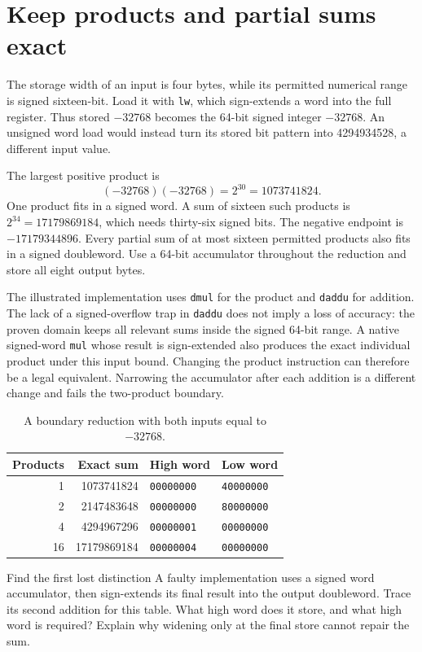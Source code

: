 \section{Keep products and partial sums exact}
The storage width of an input is four bytes, while its permitted numerical range
is signed sixteen-bit. Load it with \texttt{lw}, which sign-extends a word into
the full register. Thus stored \(-32768\) becomes the 64-bit signed integer
\(-32768\). An unsigned word load would instead turn its stored bit pattern into
4294934528, a different input value.

The largest positive product is
\[
 (-32768)(-32768)=2^{30}=1073741824.
\]
One product fits in a signed word. A sum of sixteen such products is
\(2^{34}=17179869184\), which needs thirty-six signed bits. The negative endpoint
is \(-17179344896\). Every partial sum of at most sixteen permitted products
also fits in a signed doubleword. Use a 64-bit accumulator throughout the reduction
and store all eight output bytes.

The illustrated implementation uses \texttt{dmul} for the product and
\texttt{daddu} for addition. The lack of a signed-overflow trap in \texttt{daddu}
does not imply a loss of accuracy: the proven domain keeps all relevant sums inside
the signed 64-bit range. A native signed-word \texttt{mul} whose result is sign-extended
also produces the exact individual product under this input bound. Changing the
product instruction can therefore be a legal equivalent. Narrowing the accumulator
after each addition is a different change and fails the two-product boundary.

\begin{table}[htbp]
\centering
\caption{A boundary reduction with both inputs equal to \(-32768\).}
\begin{tabular}{rrll}
\toprule
Products & Exact sum & High word & Low word\\
\midrule
1 & 1073741824 & \texttt{00000000} & \texttt{40000000}\\
2 & 2147483648 & \texttt{00000000} & \texttt{80000000}\\
4 & 4294967296 & \texttt{00000001} & \texttt{00000000}\\
16 & 17179869184 & \texttt{00000004} & \texttt{00000000}\\
\bottomrule
\end{tabular}
\end{table}

\begin{MARSExercise}{Find the first lost distinction}
A faulty implementation uses a signed word accumulator, then sign-extends its
final result into the output doubleword. Trace its second addition for this table.
What high word does it store, and what high word is required? Explain why widening
only at the final store cannot repair the sum.
\end{MARSExercise}
